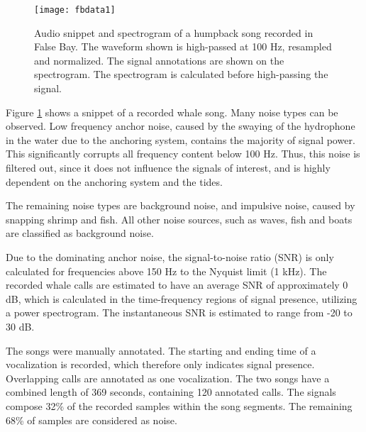 \begin{figure}[h!]
	\centering
	\texttt{[image: fbdata1]}
	\caption{Audio snippet and spectrogram of a humpback song recorded in False Bay. The waveform shown is high-passed at 100 Hz, resampled and normalized. The signal annotations are shown on the spectrogram. The spectrogram is calculated before high-passing the signal.}
	\label{fig:fbdata1}
\end{figure}

Figure \ref{fig:fbdata1} shows a snippet of a recorded whale song. Many noise types can be observed. Low frequency anchor noise, caused by the swaying of the hydrophone in the water due to the anchoring system, contains the majority of signal power. This significantly corrupts all frequency content below 100 Hz. Thus, this noise is filtered out, since it does not influence the signals of interest, and is highly dependent on the anchoring system and the tides.

The remaining noise types are background noise, and impulsive noise, caused by snapping shrimp and fish. All other noise sources, such as waves, fish and boats are classified as background noise. %

Due to the dominating anchor noise, the signal-to-noise ratio (SNR) is only calculated for frequencies above 150 Hz to the Nyquist limit (1 kHz). The recorded whale calls are estimated to have an average SNR of approximately 0 dB, which is calculated in the time-frequency regions of signal presence, utilizing a power spectrogram. The instantaneous SNR is estimated to range from -20 to 30 dB.


The songs were manually annotated. The starting and ending time of a vocalization is recorded, which therefore only indicates signal presence. Overlapping calls are annotated as one vocalization. The two songs have a combined length of 369 seconds, containing 120 annotated calls. The signals compose 32\% of the recorded samples within the song segments. The remaining 68\% of samples are considered as noise.

